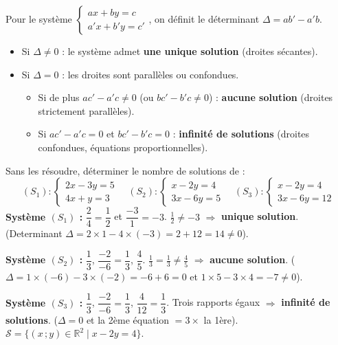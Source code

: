 \documentclass[11pt]{article}
\newcommand{\cle}[1]{{\popxbold\color{popdark}#1}}
\begin{document}
\begin{propriete}
Pour le système $\begin{cases} ax + by = c \\ a'x + b'y = c' \end{cases}$, on définit le \cle{déterminant} $\Delta = ab' - a'b$.
\begin{itemize}
\item Si $\Delta \neq 0$ : le système admet \textbf{une unique solution} (droites sécantes).
\item Si $\Delta = 0$ : les droites sont parallèles ou confondues.
\begin{itemize}
\item Si de plus $ac' - a'c \neq 0$ (ou $bc' - b'c \neq 0$) : \textbf{aucune solution} (droites strictement parallèles).
\item Si $ac' - a'c = 0$ et $bc' - b'c = 0$ : \textbf{infinité de solutions} (droites confondues, équations proportionnelles).
\end{itemize}
\end{itemize}
\end{propriete}

\begin{exoresolu}
Sans les résoudre, déterminer le nombre de solutions de :
\[ (S_1) : \begin{cases} 2x - 3y = 5 \\ 4x + y = 3 \end{cases} \quad
(S_2) : \begin{cases} x - 2y = 4 \\ 3x - 6y = 5 \end{cases} \quad
(S_3) : \begin{cases} x - 2y = 4 \\ 3x - 6y = 12 \end{cases} \]
\tcblower
\textbf{Système $(S_1)$ :} $\dfrac{2}{4} = \dfrac{1}{2}$ et $\dfrac{-3}{1} = -3$. $\frac{1}{2} \neq -3$ $\Rightarrow$ \textbf{unique solution}.
(Determinant $\Delta = 2\times 1 - 4\times(-3) = 2 + 12 = 14 \neq 0$).

\textbf{Système $(S_2)$ :} $\dfrac{1}{3}$, $\dfrac{-2}{-6} = \dfrac{1}{3}$, $\dfrac{4}{5}$. $\frac{1}{3} = \frac{1}{3} \neq \frac{4}{5}$ $\Rightarrow$ \textbf{aucune solution}.
($\Delta = 1\times(-6) - 3\times(-2) = -6 + 6 = 0$ et $1\times 5 - 3\times 4 = -7 \neq 0$).

\textbf{Système $(S_3)$ :} $\dfrac{1}{3}$, $\dfrac{-2}{-6} = \dfrac{1}{3}$, $\dfrac{4}{12} = \dfrac{1}{3}$. Trois rapports égaux $\Rightarrow$ \textbf{infinité de solutions}.
($\Delta = 0$ et la 2ème équation $= 3\times$ la 1ère). $\mathcal{S} = \{(x\,;y) \in \mathbb{R}^2 \mid x - 2y = 4\}$.
\end{exoresolu}
\end{document}
